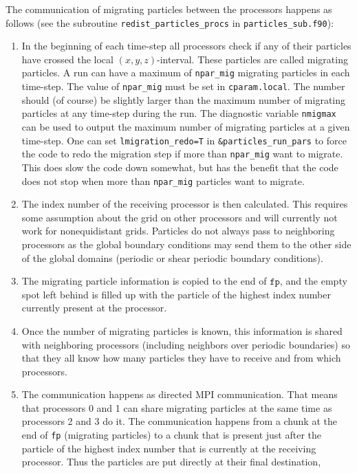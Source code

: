 \documentclass[\mydriver,12pt,twoside,notitlepage,a4paper]{article}
\newcommand{\code}[1]{\texttt{#1}}
\begin{document}
The communication of migrating particles between the processors happens as
follows (see the subroutine \code{redist_particles_procs} in
\code{particles_sub.f90}):
\begin{enumerate}
  \item In the beginning of each time-step all processors check if any of their
  particles have crossed the local $(x,y,z)$-interval. These particles are
  called migrating particles. A run can have a maximum of \code{npar_mig}
  migrating particles in each time-step. The value of \code{npar_mig} must be
  set in \code{cparam.local}. The number should (of course) be slightly larger
  than the maximum number of migrating particles at any time-step during the
  run. The diagnostic variable \code{nmigmax} can be used to output the maximum
  number of migrating particles at a given time-step. One can set
  \code{lmigration_redo=T} in \code{\&particles_run_pars} to force the code to
  redo the migration step if more than \code{npar_mig} want to migrate. This
  does slow the code down somewhat, but has the benefit that the code does not
  stop when more than \code{npar_mig} particles want to migrate.
  \item The index number of the receiving processor is then calculated. This
  requires some assumption about the grid on other processors and will
  currently not work for nonequidistant grids. Particles do not always pass to
  neighboring processors as the global boundary conditions may send them to the
  other side of the global domains (periodic or shear periodic boundary
  conditions).
  \item The migrating particle information is copied to the end of $\code{fp}$,
  and the empty spot left behind is filled up with the particle of the highest
  index number currently present at the processor.
  \item Once the number of migrating particles is known, this information is
  shared with neighboring processors (including neighbors over periodic
  boundaries) so that they all know how many particles they have to receive and
  from which processors.
  \item The communication happens as directed MPI communication. That means
  that processors 0 and 1 can share migrating particles at the same time as
  processors 2 and 3 do it. The communication happens from a chunk at the end
  of \code{fp} (migrating particles) to a chunk that is present just after the
  particle of the highest index number that is currently at the receiving
  processor. Thus the particles are put directly at their final destination,

\end{enumerate}
\end{document}
